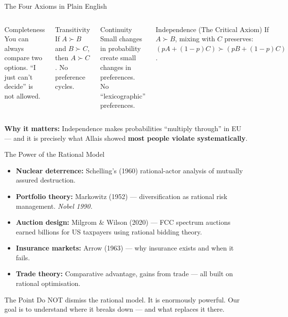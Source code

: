 \documentclass[aspectratio=169]{beamer}
\begin{document}
\begin{frame}{The Four Axioms in Plain English}
\begin{columns}
\begin{block}{Completeness}
You can always compare two options. ``I just can't decide'' is not allowed.
\end{block}
\begin{block}{Transitivity}
If $A \succ B$ and $B \succ C$, then $A \succ C$. No preference cycles.
\end{block}
\begin{block}{Continuity}
Small changes in probability create small changes in preferences. No ``lexicographic'' preferences.
\end{block}
\begin{alertblock}{Independence (The Critical Axiom)}
If $A \succ B$, mixing with $C$ preserves: $(pA + (1-p)C) \succ (pB + (1-p)C)$.
\end{alertblock}
\end{columns}
\textcolor{beteal}{\textbf{Why it matters:}} Independence makes probabilities ``multiply through'' in EU --- and it is precisely what Allais showed \textbf{most people violate systematically}.
\end{frame}

\begin{frame}{The Power of the Rational Model}
\begin{itemize}[<+->]
  \item \textbf{Nuclear deterrence:} Schelling's (1960) rational-actor analysis of mutually assured destruction.
  \item \textbf{Portfolio theory:} Markowitz (1952) --- diversification as rational risk management. \textit{Nobel 1990.}
  \item \textbf{Auction design:} Milgrom \& Wilson (2020) --- FCC spectrum auctions earned billions for US taxpayers using rational bidding theory.
  \item \textbf{Insurance markets:} Arrow (1963) --- why insurance exists and when it fails.
  \item \textbf{Trade theory:} Comparative advantage, gains from trade --- all built on rational optimisation.
\end{itemize}
\pause
\begin{alertblock}{The Point}
Do NOT dismiss the rational model. It is enormously powerful. Our goal is to understand \alert{where it breaks down} --- and what replaces it there.
\end{alertblock}
\end{frame}
\end{document}
